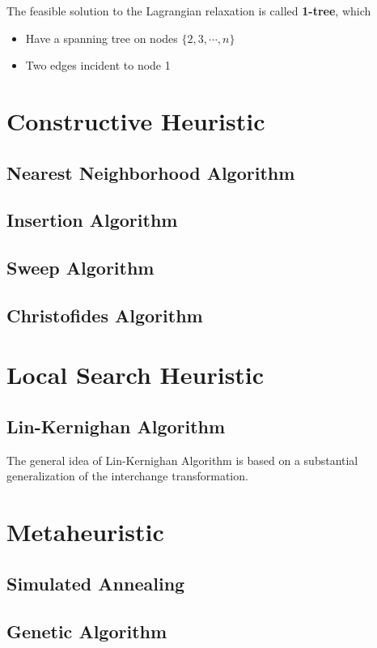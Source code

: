 					The feasible solution to the Lagrangian relaxation is called \textbf{1-tree}, which
					\begin{itemize}
						\item Have a spanning tree on nodes $\{2, 3, \cdots, n\}$
						\item Two edges incident to node 1
					\end{itemize}

			\section{Constructive Heuristic}
				\subsection{Nearest Neighborhood Algorithm}

				\subsection{Insertion Algorithm}

				\subsection{Sweep Algorithm}

				\subsection{Christofides Algorithm}

			\section{Local Search Heuristic}
				\subsection{Lin-Kernighan Algorithm}
					The general idea of Lin-Kernighan Algorithm is based on a substantial generalization of the interchange transformation.

			\section{Metaheuristic}
				\subsection{Simulated Annealing}

				\subsection{Genetic Algorithm}

